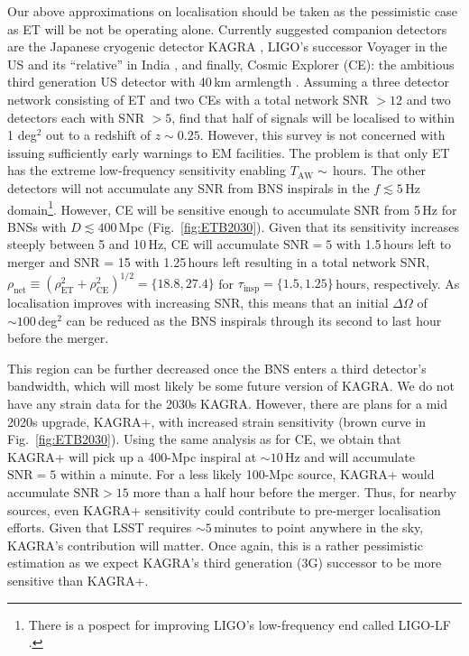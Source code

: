 \documentclass{aa}
\begin{document}
Our above approximations on localisation should be taken as the pessimistic case as 
ET will be not be operating alone. 
Currently suggested companion detectors are the Japanese cryogenic detector KAGRA \citep{Akutsu:2017thy,KAGRA2}, LIGO's successor Voyager in the US \citep{LIGO_Voy} and its ``relative'' in India \citep{Unnikrishnan:2013qwa}, 
and finally, Cosmic Explorer (CE): the ambitious third generation US detector with 40\,km armlength \citep{Evans:2016mbw}.  
Assuming a three detector network consisting of ET and two CEs with a total network SNR $> 12$ and two detectors 
each with SNR $> 5$, \cite{Mills:2017urp} find that half of signals will be localised to within 1 deg$^2$ 
out to a redshift of $z\sim 0.25$. However, this survey is not concerned with issuing sufficiently early warnings to EM facilities. %
The problem is that only ET has the extreme low-frequency sensitivity enabling $T_\text{AW}\sim\,$hours.
The other detectors will not accumulate any SNR from BNS inspirals in the $f\lesssim 5\,$Hz domain\footnote{There is a pospect for improving LIGO's low-frequency end called LIGO-LF \citep{Yu:2017zgi}.}.
However, CE will be sensitive enough to accumulate SNR from 5\,Hz for BNSs with $D\lesssim 400\,$Mpc (Fig.~\ref{fig:ETB2030}).
Given that its sensitivity increases steeply between 5 and 10\,Hz, CE will accumulate $\text{SNR} = 5$ with 1.5\,hours left to merger and SNR = 15 with 1.25\,hours left
resulting in a total network SNR, $\rho_\text{net} \equiv \left(\rho_\text{ET}^2+\rho_\text{CE}^2\right)^{1/2}=\{18.8,27.4\}$ %
for $\tau_\text{insp}=\{1.5, 1.25\}\,$hours, respectively.
As localisation improves with increasing SNR, this means that an initial $\Delta\Omega$ of $\sim 100\,$deg$^2$
can be reduced as the BNS inspirals through its second to last hour before the merger.

This region can be further decreased once the BNS enters a third detector's bandwidth,
which will most likely be some future version of KAGRA. 
We do not have any strain data for the 2030s KAGRA. 
However, there are plans for a mid 2020s upgrade, KAGRA+, with increased strain sensitivity (brown curve in Fig.~\ref{fig:ETB2030}).
Using the same analysis as for CE, we obtain that KAGRA+ will pick up a 400-Mpc inspiral at $\sim 10\,$Hz and will accumulate $\text{SNR}=5$ within a minute. 
For a less likely 100-Mpc source, KAGRA+ would accumulate $\text{SNR} > 15$ more than a half hour before the merger.
Thus, for nearby sources, even KAGRA+ sensitivity could contribute to pre-merger localisation efforts. Given that LSST requires $\sim 5\,$minutes to
point anywhere in the sky, KAGRA's contribution will matter.
Once again, this is a rather pessimistic estimation as we expect KAGRA's third generation (3G) successor 
to be more sensitive than KAGRA+.
\end{document}
